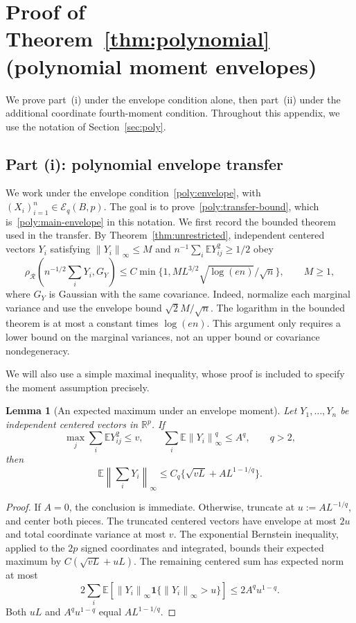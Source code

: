 \documentclass[11pt,letterpaper]{article}
\newtheorem{lemma}{Lemma}
\theoremstyle{remark}
\newcommand{\E}{\mathbb E}
\newcommand{\R}{\mathbb R}
\newcommand{\norm}[1]{\left\lVert#1\right\rVert}
\newcommand{\rh}{\rho_{\mathcal R}}
\newcommand{\ind}{\mathbf 1}
\begin{document}
\section{\texorpdfstring{{Proof of Theorem~\ref*{thm:polynomial} (polynomial moment envelopes)}}{Proof of Theorem 2 (polynomial moment envelopes)}}\label{app:polynomial-proof}

{We prove part~\textup{(i)} under the envelope
condition alone, then part~\textup{(ii)} under the additional
coordinate fourth-moment condition. Throughout this appendix, we use
the notation of Section~\ref{sec:poly}.}

\subsection{\texorpdfstring{{Part (i): polynomial envelope transfer}}{Part (i): polynomial envelope transfer}}\label{app:conditional}

{We work under the envelope
condition~\eqref{poly:envelope}, with
\((X_i)_{i=1}^n\in\mathcal E_q(B,p)\). The goal is to
prove~\eqref{poly:transfer-bound}, which is~\eqref{poly:main-envelope}
in this notation.}
We first record the bounded theorem used in the transfer. By Theorem~\ref{thm:unrestricted}, independent
centered vectors \(Y_i\) satisfying \(\norm{Y_i}_\infty\le M\)
and \(n^{-1}\sum_i\E Y_{ij}^2\ge1/2\) obey
\begin{equation}
 \rh\left(n^{-1/2}\sum_iY_i,G_Y\right)
 \le C\min\{1,ML^{3/2}\sqrt{\log(en)}/\sqrt n\},\qquad M\ge1,
 \label{app:bounded-input}
\end{equation}
where \(G_Y\) is Gaussian with the same covariance. Indeed, normalize
each marginal variance and use the envelope bound \(\sqrt2 M/\sqrt n\).
The logarithm in the bounded theorem is at most a constant times
\(\log(en)\). This argument only requires a lower bound on the marginal
variances, not an upper bound or covariance nondegeneracy.

We will also use a simple maximal inequality, whose proof is included
to specify the moment assumption precisely.

\begin{lemma}[An expected maximum under an envelope moment]\label{lem:maximum}
Let \(Y_1,\ldots,Y_n\) be independent centered vectors in \(\R^p\).
If
\[
 \max_j\sum_i\E Y_{ij}^2\le v,\qquad
 \sum_i\E\norm{Y_i}_\infty^q\le A^q,\qquad q>2,
\]
then
\begin{equation}
 \E\norm{\sum_iY_i}_\infty
 \le C_q\{\sqrt{vL}+AL^{1-1/q}\}.
 \label{app:maximal}
\end{equation}
\end{lemma}
\begin{proof}
If \(A=0\), the conclusion is immediate. Otherwise, truncate at
\(u:=AL^{-1/q}\), and center both pieces. The truncated centered
vectors have envelope at most \(2u\) and total coordinate variance at
most \(v\). The exponential Bernstein inequality, applied to the
\(2p\) signed coordinates and integrated, bounds their expected maximum
by \(C(\sqrt{vL}+uL)\). The remaining centered sum has expected norm
at most
\[
 2\sum_i\E[\norm{Y_i}_\infty\ind\{\norm{Y_i}_\infty>u\}]
 \le2A^qu^{1-q}.
\]
Both \(uL\) and \(A^qu^{1-q}\) equal \(AL^{1-1/q}\).
\end{proof}
\end{document}
